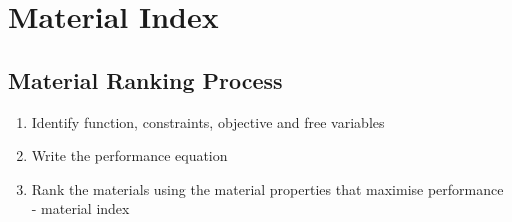 \section{Material Index} %
\label{sec:material_index}

\subsection{Material Ranking Process} %
\label{sub:material_ranking_process}

\begin{enumerate}
  \item Identify function, constraints, objective and free variables
  \item Write the performance equation
  \item Rank the materials using the material properties that maximise performance - material index
\end{enumerate}

